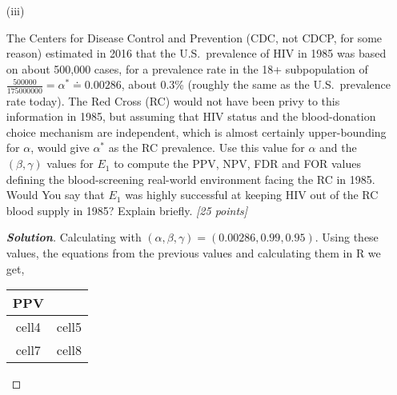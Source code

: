 \documentclass[12pt]{article}
\newenvironment{solution}{\begin{proof}[\textbf{\textit{Solution}}] }{\end{proof}}
\begin{document}
\begin{itemize}
\begin{itemize}
\begin{tcolorbox}
\begin{solution}
        Now with how FDR and FOR relate to PPV and NPV respectively. Looking at PPV and FDR we see they are complements of one another. This is because we see for calculating denominator in the FDR we have,
        \[FP + TP = \alpha\beta + (1-\alpha)(1-\gamma)\]
        which matches the denominator of the PPV. Now the reason they are complements of one another is because for the numerator of FDR we are taking the top right cell (HIV- / FP) and PPV is taking the top left cell (HIV+ / TP), but they're both over the same row total (conditioning on the same thing). In other words we can define them in terms of one another (push \& pull),
        \[PPV = 1 - FDR.\]
        By similar reasoning we have the same relation for NPV and FOR,
        \[NPV = 1 - FOR.\]


    \end{solution}
\end{tcolorbox}
\newpage
\item[(iii)]

The Centers for Disease Control and Prevention (CDC, not CDCP, for some reason) estimated in 2016 that the U.S.~prevalence of HIV in 1985 was based on about 500,000 cases, for a prevalence rate in the 18+ subpopulation of $\frac{ 500000 }{ 175000000 } = \alpha^* \doteq 0.00286$, about 0.3\% (roughly the same as the U.S.~prevalence rate today). The Red Cross (RC) would not have been privy to this information in 1985, but assuming that HIV status and the blood-donation choice mechanism are independent, which is almost certainly upper-bounding for $\alpha$, would give $\alpha^*$ as the RC prevalence. Use this value for $\alpha$ and the $( \beta, \gamma )$ values for $E_1$ to compute the PPV, NPV, FDR and FOR values defining the blood-screening real-world environment facing the RC in 1985. Would You say that $E_1$ was highly successful at keeping HIV out of the RC blood supply in 1985? Explain briefly. \textit{[25 points]}

\begin{tcolorbox}
    \begin{solution}
        Calculating with $(\alpha, \beta, \gamma ) = (0.00286, 0.99, 0.95)$. Using these values, the equations from the previous values and calculating them in R we get,
        \begin{center}
            \begin{tabular}{ |c|c| } 
             \hline
             PPV &  \\
             \hline
             cell4 & cell5 \\ 
             \hline
             cell7 & cell8 \\ 
             \hline
            \end{tabular}
            \end{center}
    \end{solution}
\end{tcolorbox}


\end{itemize}
\end{itemize}
\end{document}
